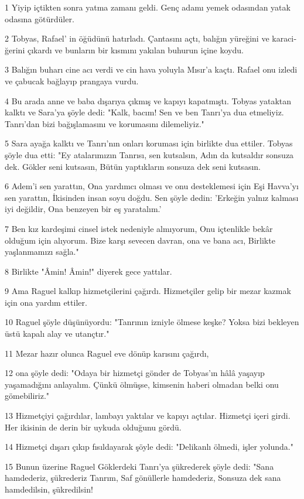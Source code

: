 \par 1 Yiyip içtikten sonra yatma zama­nı geldi. Genç adamı yemek oda­sından yatak odasına götürdüler.
\par 2 Tob­yas, Rafael' in öğüdünü hatırladı. Çan­tasını açtı, balığın yüreğini ve karaci­ğerini çıkardı ve bunların bir kısmını yakılan buhurun içine koydu.
\par 3 Balığın buharı cine acı verdi ve cin hava yo­luyla Mısır'a kaçtı. Rafael onu izledi ve çabucak bağlayıp prangaya vurdu.
\par 4 Bu arada anne ve baba dışarıya çıkmış ve kapıyı kapatmıştı. Tobyas yataktan kalktı ve Sara'ya şöyle dedi: "Kalk, bacım! Sen ve ben Tanrı'ya dua etmeliyiz. Tanrı'dan bizi bağışla­masını ve korumasını dilemeliyiz."
\par 5 Sara ayağa kalktı ve Tanrı'nın onları koruması için birlikte dua ettiler. Tob­yas şöyle dua etti: "Ey atalarımızın Tanrısı, sen kutsalsın, Adın da kutsaldır sonsuza dek. Gökler seni kutsasın, Bütün yaptıkların sonsuza dek seni kutsasın.
\par 6 Adem'i sen yarattın, Ona yardımcı olması ve onu desteklemesi için Eşi Havva'yı sen yarattın, İkisinden insan soyu doğdu. Sen şöyle dedin: 'Erkeğin yalnız kalması iyi değildir, Ona benzeyen bir eş yaratalım.'
\par 7 Ben kız kardeşimi cinsel istek nedeniyle almıyorum, Onu içtenlikle bekâr olduğum için alıyorum. Bize karşı sevecen davran, ona ve bana acı, Birlikte yaşlanmamızı sağla."
\par 8 Birlikte "Âmin! Âmin!" diyerek gece yattılar.
\par 9 Ama Raguel kalkıp hizmetçileri­ni çağırdı. Hizmetçiler gelip bir me­zar kazmak için ona yardım ettiler.
\par 10 Raguel şöyle düşünüyordu: "Tanrı­nın izniyle ölmese keşke? Yoksa bizi bekleyen üstü kapalı alay ve utanç­tır."
\par 11 Mezar hazır olunca Raguel eve dönüp karısını çağırdı,
\par 12 ona şöyle dedi: "Odaya bir hizmetçi gönder de Tobyas'ın hâlâ yaşayıp yaşamadığını anlayalım. Çünkü ölmüşse, kimsenin haberi olmadan belki onu gömebili­riz."
\par 13 Hizmetçiyi çağırdılar, lambayı yaktılar ve kapıyı açtılar. Hizmetçi içeri girdi. Her ikisinin de derin bir uykuda olduğunu gördü.
\par 14 Hizmetçi dışarı çıkıp fısıldayarak şöyle dedi: "Delikanlı ölmedi, işler yolunda."
\par 15 Bunun üzerine Raguel Göklerdeki Tanrı'ya şükrederek şöyle dedi: "Sana hamdederiz, şükrederiz Tanrım, Saf gönüllerle hamdederiz, Sonsuza dek sana hamdedilsin, şükredilsin!

